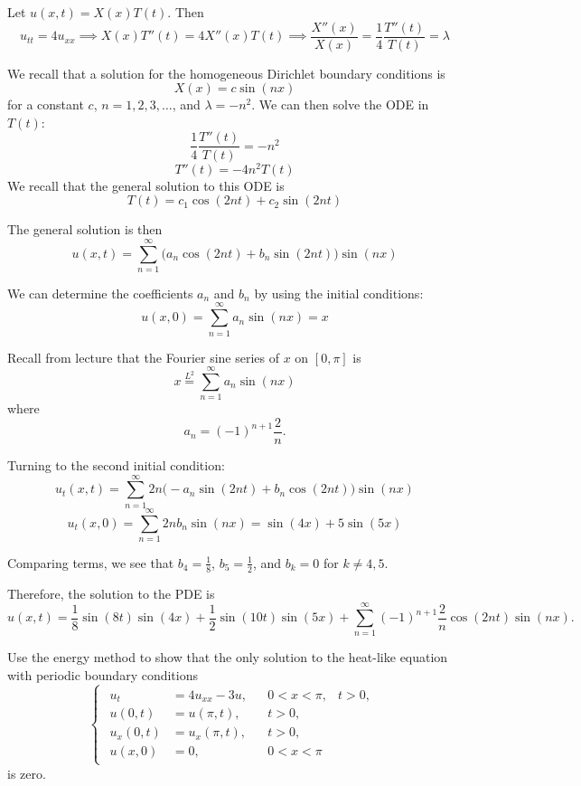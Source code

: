 \documentclass[plain]{pset}
\begin{document}
\begin{solution}
    Let \(u(x, t) = X(x)T(t)\). Then
    \[u_{tt} = 4u_{xx} \implies X(x)T''(t) = 4X''(x)T(t) \implies \frac{X''(x)}{X(x)} = \frac{1}{4}\frac{T''(t)}{T(t)} = \lambda\]

    We recall that a solution for the homogeneous Dirichlet boundary conditions is
    \[X(x) = c \sin(nx)\]
    for a constant \(c\), \(n = 1, 2, 3, \ldots\), and \(\lambda = -n^2\). We can then solve the ODE in \(T(t)\):
    \[\frac{1}{4}\frac{T''(t)}{T(t)} = -n^2\]
    \[T''(t) = -4n^2T(t)\]
    We recall that the general solution to this ODE is
    \[T(t) = c_1\cos(2nt) + c_2\sin(2nt)\]

    The general solution is then
    \[u(x, t) = \sum_{n=1}^\infty \bigl(a_n\cos(2nt) + b_n\sin(2nt)\bigr)\sin(nx)\]

    We can determine the coefficients \(a_n\) and \(b_n\) by using the initial conditions:
    \[u(x, 0) = \sum_{n=1}^\infty a_n \sin(nx) = x\]

    Recall from lecture that the Fourier sine series of \(x\) on \([0, \pi]\) is
    \[x \stackrel{L^2}{=} \sum_{n=1}^\infty a_n \sin(nx)\]
    where
    \[a_n = (-1)^{n+1} \frac{2}{n}.\]

    Turning to the second initial condition:
    \[u_t(x, t) = \sum_{n=1}^\infty 2n\bigl(-a_n\sin(2nt) + b_n\cos(2nt)\bigr)\sin(nx)\]
    \[u_t(x, 0) = \sum_{n=1}^\infty 2n b_n \sin(nx) = \sin(4x) + 5\sin(5x)\]

    Comparing terms, we see that \(b_4 = \frac{1}{8}\), \(b_5 = \frac{1}{2}\), and \(b_k = 0\) for \(k \neq 4, 5\).

    Therefore, the solution to the PDE is
    \[u(x, t) = \frac{1}{8}\sin(8t)\sin(4x) + \frac{1}{2}\sin(10t)\sin(5x) + \sum_{n=1}^\infty (-1)^{n+1} \frac{2}{n}\cos(2nt)\sin(nx).\]
\end{solution}

\pagebreak

\begin{problem}
Use the energy method to show that the only solution to the heat-like equation with periodic boundary conditions
\[
    \begin{cases}
        \begin{aligned}
            u_t       & = 4u_{xx} - 3u, &  & 0 < x < \pi, & t > 0, \\
            u(0, t)   & = u(\pi, t),    &  & t > 0,       &        \\
            u_x(0, t) & = u_x(\pi, t),  &  & t > 0,       &        \\
            u(x, 0)   & = 0,            &  & 0 < x < \pi
        \end{aligned}
    \end{cases}
\]
is zero.
\end{problem}
\end{document}
